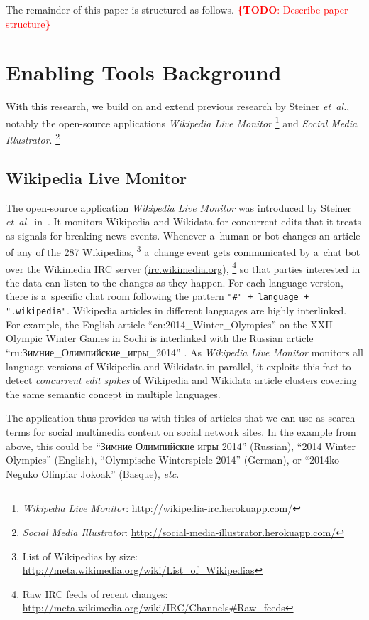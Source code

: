 \documentclass{sig-alternate}
\newcommand{\inlinelistingsize}{\fontsize{8pt}{11pt}}
\let\oldurl\url
\renewcommand{\url}[1]{\inlinelistingsize\oldurl{#1}}
\newcommand{\todo}[1]{\noindent\textcolor{red}{{\bf \{TODO}: #1{\bf \}}}}
\begin{document}
The remainder of this paper is structured as follows.
\todo{Describe paper structure}

\section{Enabling Tools Background}
\selectfont

With this research, we build on and extend previous research
by Steiner \emph{et~al.}, notably
the open-source applications \emph{Wikipedia Live Monitor}%
\footnote{\emph{Wikipedia Live Monitor}:
\url{http://wikipedia-irc.herokuapp.com/}}
and \emph{Social Media Illustrator}.%
\footnote{\emph{Social Media Illustrator}:
\url{http://social-media-illustrator.herokuapp.com/}}

\subsection{Wikipedia Live Monitor}

The open-source application \emph{Wikipedia Live Monitor}
was introduced by Steiner \emph{et~al.}\
in~\cite{steiner2013mjnomore}.
It monitors Wikipedia and Wikidata for concurrent edits
that it treats as signals for breaking news events.
Whenever a~human or bot changes an article
of any of the 287 Wikipedias,%
\footnote{List of Wikipedias by size:
\url{http://meta.wikimedia.org/wiki/List_of_Wikipedias}}
a~change event gets communicated by a~chat bot
over the Wikimedia IRC server (\url{irc.wikimedia.org}),%
\footnote{Raw IRC feeds of recent changes:
\url{http://meta.wikimedia.org/wiki/IRC/Channels\#Raw_feeds}}
so that parties interested in the data
can listen to the changes as they happen.
For each language version, there is
a~specific chat room following the pattern
\texttt{"\#" + language + ".wikipedia"}.
Wikipedia articles in different languages are highly interlinked.
For example, the English article
``en:2014\_Winter\_Olympics''
on the XXII Olympic Winter Games in Sochi
is interlinked with the Russian article
\selectfont%
``ru:Зимние\_Олимпийские\_игры\_2014''%
\selectfont.
As \emph{Wikipedia Live Monitor} monitors all language versions
of Wikipedia and Wikidata in parallel,
it exploits this fact to detect \emph{concurrent edit spikes}
of Wikipedia and Wikidata article clusters covering
the same semantic concept in multiple languages.

The application thus provides us with titles of articles
that we can use as search terms for social multimedia content
on social network sites.
In the example from above, this could be
\selectfont%
``Зимние Олимпийские игры 2014''%
\selectfont (Russian),
``2014 Winter Olympics'' (English),
``Olympische Winterspiele 2014'' (German),
or ``2014ko Neguko Olinpiar Jokoak'' (Basque), \emph{etc.}
\end{document}
